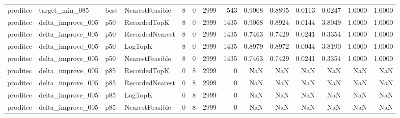 \begin{tabular}{llllrrrrrrrrrr}
proditec &       target\_min\_085 &   best & NearestFeasible &           8 &          0 &           2999 &                 543 &         0.9008 &          0.8895 &                    0.0113 &         0.0247 &                 1.0000 &                  1.0000 \\
proditec &    delta\_improve\_005 &    p50 &    RecordedTopK &           8 &          0 &           2999 &                1435 &         0.9068 &          0.8924 &                    0.0144 &         3.8049 &                 1.0000 &                  1.0000 \\
proditec &    delta\_improve\_005 &    p50 & RecordedNearest &           8 &          0 &           2999 &                1435 &         0.7463 &          0.7429 &                    0.0241 &         0.3354 &                 1.0000 &                  1.0000 \\
proditec &    delta\_improve\_005 &    p50 &         LogTopK &           8 &          0 &           2999 &                1435 &         0.8979 &          0.8972 &                    0.0044 &         3.8190 &                 1.0000 &                  1.0000 \\
proditec &    delta\_improve\_005 &    p50 & NearestFeasible &           8 &          0 &           2999 &                1435 &         0.7463 &          0.7429 &                    0.0241 &         0.3354 &                 1.0000 &                  1.0000 \\
proditec &    delta\_improve\_005 &    p85 &    RecordedTopK &           0 &          8 &           2999 &                   0 &            NaN &             NaN &                       NaN &            NaN &                    NaN &                     NaN \\
proditec &    delta\_improve\_005 &    p85 & RecordedNearest &           0 &          8 &           2999 &                   0 &            NaN &             NaN &                       NaN &            NaN &                    NaN &                     NaN \\
proditec &    delta\_improve\_005 &    p85 &         LogTopK &           0 &          8 &           2999 &                   0 &            NaN &             NaN &                       NaN &            NaN &                    NaN &                     NaN \\
proditec &    delta\_improve\_005 &    p85 & NearestFeasible &           0 &          8 &           2999 &                   0 &            NaN &             NaN &                       NaN &            NaN &                    NaN &                     NaN \\

\end{tabular}
